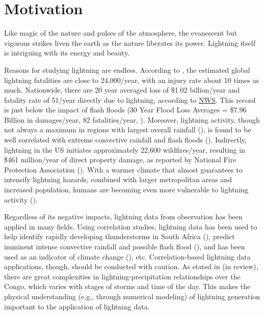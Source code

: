  
\chapter{Motivation}
\resetfootnote %

Like magic of the nature and pulses of the atmosphere, the evanescent but vigorous strikes liven the earth as the nature liberates its power. Lightning itself is intriguing with its energy and beauty. 

Reasons for studying lightning are endless. According to \cite{holle2016number}, the estimated global lightning fatalities are close to 24,000/year, with an injury rate about 10 times as much. Nationwide, there are 20 year averaged loss  of \$1.02 billion/year and fatality rate of 51/year directly due to lightning, according to \href{https://www.weather.gov/safety/lightning-fatalities}{NWS}. This record is just below the impact of flash floods (30 Year Flood Loss Averages = \$7.96 Billion in damages/year, 82 fatalities/year, \cite{nws2018}). Moreover, lightning activity, though not always a maximum in regions with largest overall rainfall (\cite{holle2016lightning}), is found to be well correlated with extreme convective rainfall and flash floods (\cite{price2011using,lynn2010prediction,soula2001some,carte1977lightning,tapia1998estimation}). Indirectly, lightning in the US initiates approximately 22,600 wildfires/year, resulting in \$461 million/year of direct property damage, as reported by National Fire Protection Association (\cite{ahrens2013lightning}). With a warmer climate that almost guarantees to intensify lightning hazards, combined with larger metropolitan areas and increased population, humans are becoming even more vulnerable to lightning activity (\cite{yair2018lightning}).

Regardless of its negative impacts, lightning data from observation has been applied in many fields. Using correlation studies, lightning data has been used to help identify rapidly developing thunderstorms in South Africa (\cite{gijben2017using}), predict imminent intense convective rainfall and possible flash flood  (\cite{price2011using}), and has been used as an indicator of climate change (\cite{reeve1999lightning}), etc. Correlation-based lightning data applications, though, should be conducted with caution. As stated in \cite{solimine2021relationships} (in review), there are great complexities in lightning-precipitation relationships over the Congo, which varies with stages of storms and time of the day. This makes the physical understanding (e.g., through numerical modeling) of lightning generation important to the application of lightning data. 

